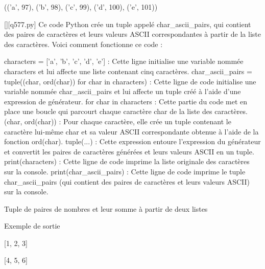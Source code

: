 (('a', 97), ('b', 98), ('c', 99), ('d', 100), ('e', 101))
        \par
        \begin{solution}
            \renewcommand{\nomfichier}{q577.py}
            \pythonfile{\chemincode \nomfichier}[][\nomfichier]
            Ce code Python crée un tuple appelé char\_ascii\_pairs, qui contient des paires de caractères et leurs valeurs ASCII correspondantes à partir de la liste des caractères. Voici comment fonctionne ce code :

    characters = ['a', 'b', 'c', 'd', 'e'] : Cette ligne initialise une variable nommée characters et lui affecte une liste contenant cinq caractères.
    char\_ascii\_pairs = tuple((char, ord(char)) for char in characters) : Cette ligne de code initialise une variable nommée char\_ascii\_pairs et lui affecte un tuple créé à l'aide d'une expression de générateur.
        for char in characters : Cette partie du code met en place une boucle qui parcourt chaque caractère char de la liste des caractères.
        (char, ord(char)) : Pour chaque caractère, elle crée un tuple contenant le caractère lui-même char et sa valeur ASCII correspondante obtenue à l'aide de la fonction ord(char).
        tuple(...) : Cette expression entoure l'expression du générateur et convertit les paires de caractères générées et leurs valeurs ASCII en un tuple.
    print(characters) : Cette ligne de code imprime la liste originale des caractères sur la console.
    print(char\_ascii\_pairs) : Cette ligne de code imprime le tuple char\_ascii\_pairs (qui contient des paires de caractères et leurs valeurs ASCII) sur la console.
        \end{solution}
        

        \question
        Tuple de paires de nombres et leur somme à partir de deux listes

Exemple de sortie

[1, 2, 3]

[4, 5, 6]

